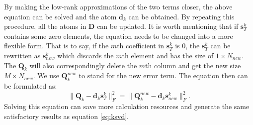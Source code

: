 By making the low-rank approximations of the two terms closer, the above equation can be solved and the atom $\mathbf{d}_{k}$ can be obtained. By repeating this procedure, all the atoms in $\mathbf{D}$ can be updated. It is worth mentioning that if $\mathbf{s}_{T}^{k}$ contains some zero elements, the equation needs to be changed into a more flexible form. That is to say, if the $m$th coefficient in $\mathbf{s}_{T}^{k}$ is 0, the $\mathbf{s}_{T}^{k}$ can be rewritten as $\mathbf{s}_{new}^{k}$ which discards the $m$th element and has the size of $1\times N_{new}$. The $\mathbf{Q}_{k}$ will also correspondingly delete the $m$th column and get the new size $M\times N_{new}$.  We use $\mathbf{Q}_{k}^{new}$ to stand for the new error term. The equation then can be formulated as:
\begin{equation}
\label{eq:err}
\parallel \mathbf{Q}_{k}-\mathbf{d}_{k}\mathbf{s}_{T}^{k} \parallel_{F}^{2}=\parallel \mathbf{Q}_{k}^{new}-\mathbf{d}_{k}\mathbf{s}_{new}^{k} \parallel_{F}^{2}.
\end{equation}
Solving this equation can save more calculation resources and generate the same satisfactory results as equation \ref{eq:ksvd}.


